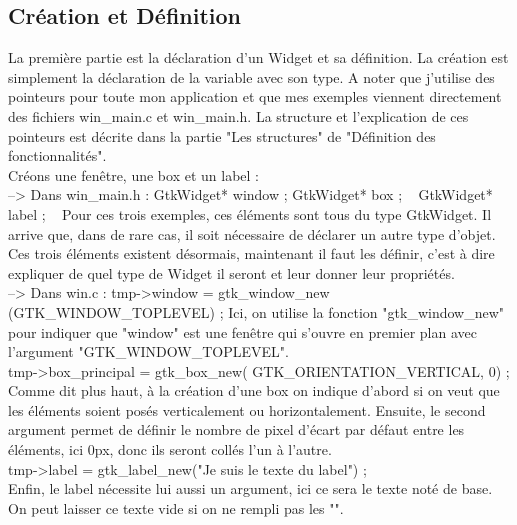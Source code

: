 \documentclass[11pt,french,a4paper]{report}
\begin{document}
        \subsection{Création et Définition}
La première partie est la déclaration d'un Widget et sa définition. La création est simplement la déclaration de la variable avec son type. A noter que j'utilise des pointeurs
pour toute mon application et que mes exemples viennent directement des fichiers win\_main.c et win\_main.h. La structure et l'explication de ces pointeurs est décrite
dans la partie "Les structures" de "Définition des fonctionnalités". \\
Créons une fenêtre, une box et un label : \\
--> Dans win\_main.h : 
GtkWidget* window ; 
GtkWidget* box ;   
GtkWidget* label ;  
    Pour ces trois exemples, ces éléments sont tous du type GtkWidget. Il arrive que, dans de rare cas, il soit nécessaire de déclarer un autre type d'objet. \\ 

Ces trois éléments existent désormais, maintenant il faut les définir, c'est à dire expliquer de quel type de Widget il seront et leur donner leur propriétés. \\
--> Dans win\main.c : 
tmp->window = gtk\_window\_new (GTK\_WINDOW\_TOPLEVEL) ;
Ici, on utilise la fonction "gtk\_window\_new" pour indiquer que "window" est une fenêtre qui s'ouvre en premier plan avec l'argument "GTK\_WINDOW\_TOPLEVEL". \\

tmp->box\_principal = gtk\_box\_new( GTK\_ORIENTATION\_VERTICAL, 0) ;
Comme dit plus haut, à la création d'une box on indique d'abord si on veut que les éléments soient posés verticalement ou horizontalement. Ensuite, le second
argument permet de définir le nombre de pixel d'écart par défaut entre les éléments, ici 0px, donc ils seront collés l'un à l'autre.  \\
tmp->label = gtk\_label\_new("Je suis le texte du label") ; \\
Enfin, le label nécessite lui aussi un argument, ici ce sera le texte noté de base. On peut laisser ce texte vide si on ne rempli pas les "".  \\
\end{document}
